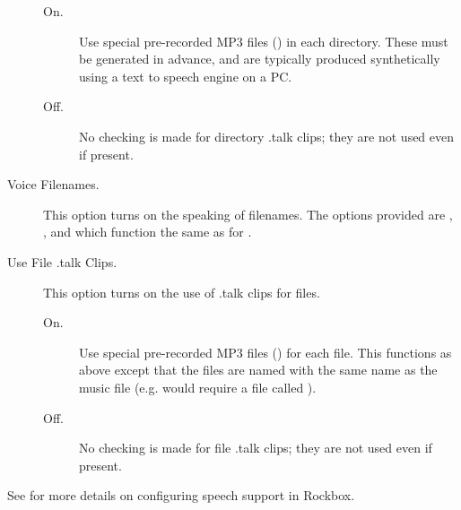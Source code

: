 \begin{description}
    \begin{description}
    \item[On.]
      Use special pre-recorded MP3 files () in each 
      directory.  These must be generated in advance, and are typically 
      produced synthetically using a text to speech engine on a PC.
    \item[Off.]
      No checking is made for directory .talk clips; they are not used even if present.
    \end{description}

  \item[Voice Filenames.]
    This option turns on the speaking of filenames.  The options provided
    are , , and  which function
    the same as for .

  \item[Use File .talk Clips.]
    This option turns on the use of .talk clips for files.
    \begin{description}
    \item[On.]
      Use special pre-recorded MP3 files () for each file.
      This functions as above except that the files are named with the same
      name as the music file (e.g.  would require a
      file called ).
    \item[Off.]
     No checking is made for file .talk clips; they are not used even if present.
    \end{description}

  \end{description}

See  for more details on configuring speech support in Rockbox.
